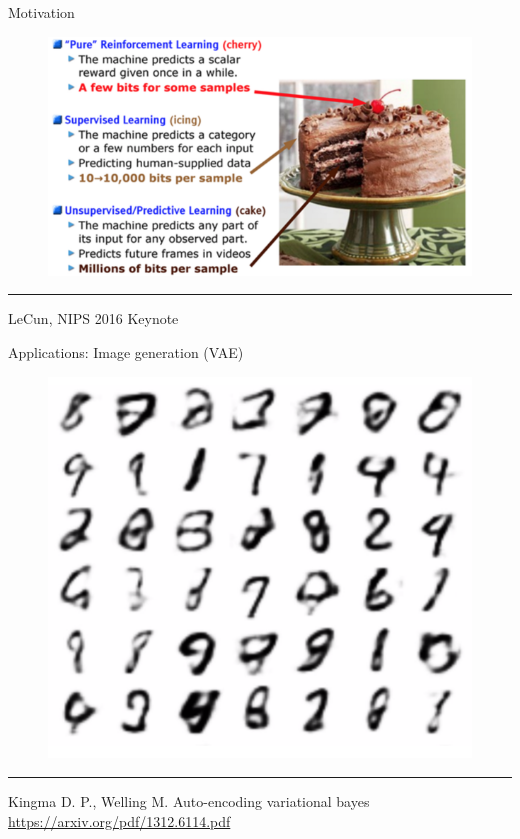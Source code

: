 \documentclass{beamer}
\begin{document}
\begin{frame}{Motivation}
    \begin{figure}
        \centering
        \includegraphics[width=\linewidth]{figs/unsupervised_cake.png}
        \label{fig:unsupervised_cake}
    \end{figure}
\vfill
\hrule\medskip
{\scriptsize LeCun, NIPS 2016 Keynote}
\end{frame}
\begin{frame}{Applications: Image generation (VAE)}
    \begin{figure}
        \centering
        \includegraphics[width=0.5\linewidth]{figs/vae.png}
        \label{fig:vae}
    \end{figure}
\vfill
\hrule\medskip
{\scriptsize Kingma D. P., Welling M. Auto-encoding variational bayes \href{https://arxiv.org/pdf/1312.6114.pdf}{https://arxiv.org/pdf/1312.6114.pdf}}
\end{frame}
\end{document}
